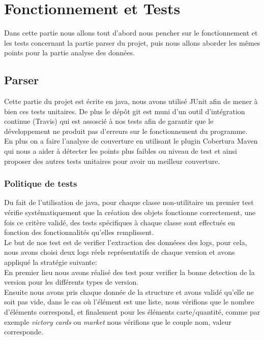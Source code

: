 \chapter{Fonctionnement et Tests}

Dans cette partie nous allons tout d'abord nous pencher sur le fonctionnement et les tests concernant la partie parser du projet, puis nous allons aborder les mêmes points pour la partie analyse des données.

\section{Parser}

Cette partie du projet est écrite en java, nous avons utilisé JUnit afin de mener à bien ces tests unitaires. De plus le dépôt git est muni d'un outil d'intégration continue (Travis) qui est assoscié à nos tests afin de garantir que le développement ne produit pas d'erreurs sur le fonctionnement du programme. \\

En plus on a faire l'analyse de couverture en utilisant le plugin Cobertura Maven qui nous a aider à détecter les points plus faibles ou niveau de test et ainsi proposer des autres tests unitaires pour avoir un meilleur couverture.


\subsection{Politique de tests}

Du fait de l'utilisation de java, pour chaque classe non-utilitaire un premier test vérifie systématiquement que la création des objets fonctionne correctement, une fois ce critère validé, des tests spécifiques à chaque classe sont effectués en fonction des fonctionnalités qu'elles remplissent.\\

Le but de nos test est de verifier l'extraction des donnéees des logs, pour cela, nous avons choisi deux logs réels représentatifs de chaque version et avons appliqué la stratégie suivante:  \\
En premier lieu nous avons réalisé des test pour verifier la bonne detection de la version pour les différents types de version. \\
Ensuite nous avons pris chaque donnée de la structure et avons validé qu'elle ne soit pas vide, dans le cas où l'élément est une liste, nous vérifions que le nombre d'éléments correspond, et finalement pour les éléments carte/quantité, comme par exemple \textit{victory cards} ou \textit{market} nous vérifions que le couple nom, valeur corresponde.

